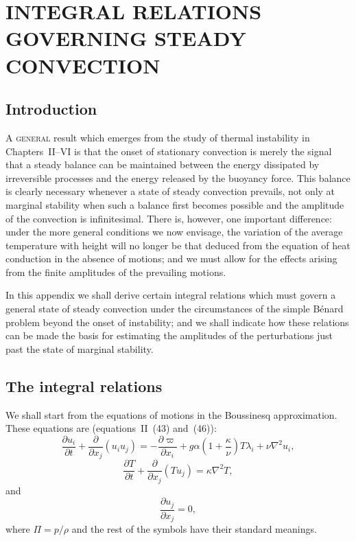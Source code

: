 \chapter{INTEGRAL RELATIONS GOVERNING STEADY CONVECTION}
\label{app:I}

\section{Introduction}\label{sec:124}

A \textsc{general} result which emerges from the study of thermal instability in Chapters~II--VI is that the onset of stationary convection is merely the signal that a steady balance can be maintained between the energy dissipated by irreversible processes and the energy released by the buoyancy force. This balance is clearly necessary whenever a state of steady convection prevails, not only at marginal stability when such a balance first becomes possible and the amplitude of the convection is infinitesimal. There is, however, one important difference: under the more general conditions we now envisage, the variation of the average temperature with height will no longer be that deduced from the equation of heat conduction in the absence of motions; and we must allow for the effects arising from the finite amplitudes of the prevailing motions.

In this appendix we shall derive certain integral relations which must govern a general state of steady convection under the circumstances of the simple B\'enard problem beyond the onset of instability; and we shall indicate how these relations can be made the basis for estimating the amplitudes of the perturbations just past the state of marginal stability.

\section{The integral relations}\label{sec:125}

We shall start from the equations of motions in the Boussinesq approximation. These equations are (equations~II~(43) and~(46)):
\begin{equation}
\label{eq:A1-1}
\frac{\partial u_i}{\partial t} + \frac{\partial}{\partial x_j}(u_i u_j) = -\frac{\partial \varpi}{\partial x_i} + g\alpha\left(1 + \frac{\kappa}{\nu}\right) T \lambda_i + \nu \nabla^2 u_i,
\end{equation}
\begin{equation}
\label{eq:A1-2}
\frac{\partial T}{\partial t} + \frac{\partial}{\partial x_j}(T u_j) = \kappa \nabla^2 T,
\end{equation}
and
\begin{equation}
\label{eq:A1-3}
\frac{\partial u_j}{\partial x_j} = 0,
\end{equation}
where $\Pi = p/\rho$ and the rest of the symbols have their standard meanings.

